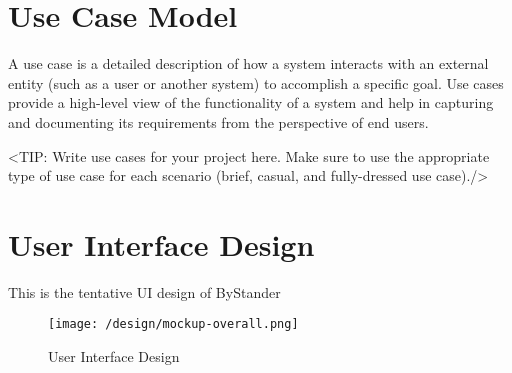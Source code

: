 \section{Use Case Model}
\label{section:use-case-model}
A use case is a detailed description of how a system
interacts with an external entity (such as a user or another system) to
accomplish a specific goal. Use cases provide a high-level view of the
functionality of a system and help in capturing and documenting its
requirements from the perspective of end users.

<TIP: Write use cases for your project here. Make sure to use the
appropriate type of use case for each scenario (brief, casual, and fully-dressed
use case)./>

\section{User Interface Design}
\label{section:user-interface-design}
This is the tentative UI design of ByStander

\begin{figure}[h]
    \centering
    \texttt{[image: /design/mockup-overall.png]}
    \caption{User Interface Design}
\end{figure}